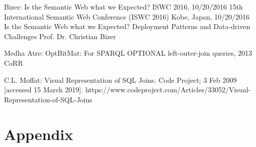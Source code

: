 \documentclass[10pt,a4paper]{article}
\begin{document}
	
	\begin{thebibliography}{9}
		Bizer: Is the Semantic Web what we Expected? ISWC 2016, 10/20/2016 15th International Semantic Web Conference (ISWC 2016) Kobe, Japan, 10/20/2016 Is the Semantic Web what we Expected? Deployment Patterns and Data-driven Challenges Prof. Dr. Christian Bizer
		
		Medha Atre: OptBitMat: For SPARQL OPTIONAL left-outer-join queries, 2013 CoRR
		
		C.L. Moffat: Visual Representation of SQL Joins. Code Project; 3 Feb 2009 [accessed 15 March 2019]. https://www.codeproject.com/Articles/33052/Visual-Representation-of-SQL-Joins
	\end{thebibliography}

	\pagebreak
	\section*{Appendix}
\end{document}
